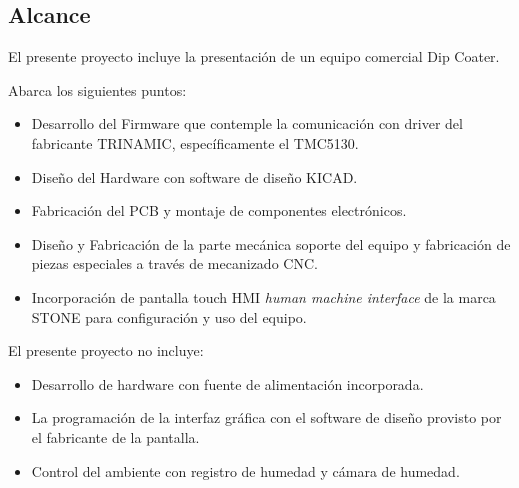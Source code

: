 \subsection{Alcance}

El presente proyecto incluye la presentación de un equipo comercial Dip Coater. 

Abarca los siguientes puntos:

\begin{itemize}
\item Desarrollo del Firmware que contemple la comunicación con driver del fabricante TRINAMIC, específicamente el TMC5130.
\item Diseño del Hardware con software de diseño KICAD.
\item Fabricación del PCB y montaje de componentes electrónicos.
\item Diseño y Fabricación de la parte mecánica soporte del equipo y fabricación de piezas especiales a través de mecanizado CNC.
\item Incorporación de pantalla touch HMI \textit{human machine interface} de la marca STONE para configuración y uso del equipo.
\end{itemize}



El presente proyecto no incluye:

\begin{itemize}
\item Desarrollo de hardware con fuente de alimentación incorporada.
\item La programación de la interfaz gráfica con el software de diseño provisto por el fabricante de la pantalla.
\item Control del ambiente con registro de humedad y  cámara de humedad.
\end{itemize}




